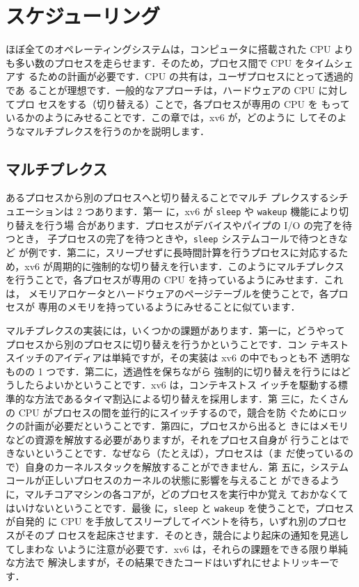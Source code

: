 % 
%  
\chapter{スケジューリング}
\label{CH:SCHED}

ほぼ全てのオペレーティングシステムは，コンピュータに搭載された CPU より
も多い数のプロセスを走らせます．そのため，プロセス間で CPU をタイムシェアす
るための計画が必要です．CPU の共有は，ユーザプロセスにとって透過的であ
ることが理想です．一般的なアプローチは，ハードウェアの CPU に対してプロ
セスをする（切り替える）ことで，各プロセスが専用の CPU を
もっているかのようにみせることです．この章では，xv6 が，どのように
してそのようなマルチプレクスを行うのかを説明します．

\section{マルチプレクス}

あるプロセスから別のプロセスへと切り替えることでマルチ
プレクスするシチュエーションは 2 つあります．第一
に，xv6 が \lstinline{sleep} や \lstinline{wakeup} 機能により切り替えを行う場
合があります．プロセスがデバイスやパイプの I/O の完了を待つとき，
子プロセスの完了を待つときや，\lstinline{sleep} システムコールで待つときなど
が例です．第二に，スリープせずに長時間計算を行うプロセスに対応するた
め，xv6 が周期的に強制的な切り替えを行います．このようにマルチプレクス
を行うことで，各プロセスが専用の CPU を持っているようにみせます．これは，
メモリアロケータとハードウェアのページテーブルを使うことで，各プロセスが
専用のメモリを持っているようにみせることに似ています．

マルチプレクスの実装には，いくつかの課題があります．第一に，どうやって
プロセスから別のプロセスに切り替えを行うかということです．コン
テキストスイッチのアイディアは単純ですが，その実装は xv6 の中でもっとも不
透明なものの 1 つです．第二に，透過性を保ちながら
強制的に切り替えを行うにはどうしたらよいかということです．xv6 は，コンテキストス
イッチを駆動する標準的な方法であるタイマ割込による切り替えを採用します．第
三に，たくさんの CPU がプロセスの間を並行的にスイッチするので，競合を防
ぐためにロックの計画が必要だということです．第四に，プロセスから出ると
きにはメモリなどの資源を解放する必要がありますが，それをプロセス自身が
行うことはできないということです．なぜなら（たとえば），プロセスは（ま
だ使っているので）自身のカーネルスタックを解放することができません．第
五に，システムコールが正しいプロセスのカーネルの状態に影響を与えること
ができるように，マルチコアマシンの各コアが，どのプロセスを実行中か覚え
ておかなくてはいけないということです．最後
に，\lstinline{sleep} と \lstinline{wakeup} を使うことで，プロセスが自発的
に CPU を手放してスリープしてイベントを待ち，いずれ別のプロセスがそのプ
ロセスを起床させます．そのとき，競合により起床の通知を見逃してしまわな
いように注意が必要です．xv6 は，それらの課題をできる限り単純な方法で
解決しますが，その結果できたコードはいずれにせよトリッキーです．

